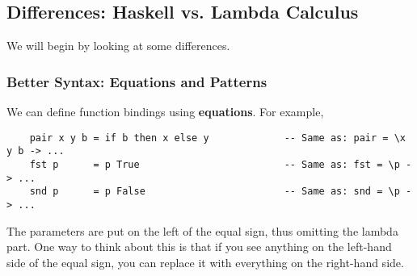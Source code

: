 \documentclass[letterpaper]{article}
\begin{document}
\subsection{Differences: Haskell vs. Lambda Calculus}
We will begin by looking at some differences. 

\subsubsection{Better Syntax: Equations and Patterns}
We can define function bindings using \textbf{equations}. For example,
\begin{verbatim}
    pair x y b = if b then x else y             -- Same as: pair = \x y b -> ... 
    fst p      = p True                         -- Same as: fst = \p -> ... 
    snd p      = p False                        -- Same as: snd = \p -> ...
\end{verbatim}
The parameters are put on the left of the equal sign, thus omitting the lambda part. One way to think about this is that if you see anything on the left-hand side of the equal sign, you can replace it with everything on the right-hand side. 

\bigskip 
\end{document}
